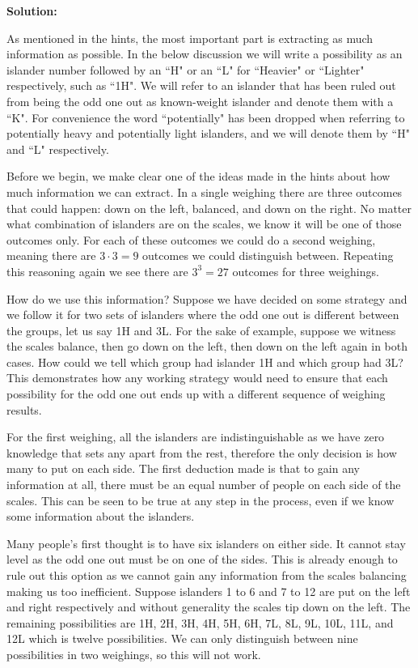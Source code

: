 \textbf{Solution:}

As mentioned in the hints, the most important part is extracting as much information as possible. In the below discussion we will write a possibility as an islander number followed by an ``H" or an ``L" for ``Heavier" or ``Lighter" respectively, such as ``1H". We will refer to an islander that has been ruled out from being the odd one out as known-weight islander and denote them with a ``K". For convenience the word ``potentially" has been dropped when referring to potentially heavy and potentially light islanders, and we will denote them by ``H" and ``L" respectively.

Before we begin, we make clear one of the ideas made in the hints about how much information we can extract. In a single weighing there are three outcomes that could happen: down on the left, balanced, and down on the right. No matter what combination of islanders are on the scales, we know it will be one of those outcomes only. For each of these outcomes we could do a second weighing, meaning there are $3 \cdot 3 = 9$ outcomes we could distinguish between. Repeating this reasoning again we see there are $3^3 = 27$ outcomes for three weighings.

How do we use this information? Suppose we have decided on some strategy and we follow it for two sets of islanders where the odd one out is different between the groups, let us say 1H and 3L. For the sake of example, suppose we witness the scales balance, then go down on the left, then down on the left again in both cases. How could we tell which group had islander 1H and which group had 3L? This demonstrates how any working strategy would need to ensure that each possibility for the odd one out ends up with a different sequence of weighing results.

For the first weighing, all the islanders are indistinguishable as we have zero knowledge that sets any apart from the rest, therefore the only decision is how many to put on each side. The first deduction made is that to gain any information at all, there must be an equal number of people on each side of the scales. This can be seen to be true at any step in the process, even if we know some information about the islanders.

Many people's first thought is to have six islanders on either side. It cannot stay level as the odd one out must be on one of the sides. This is already enough to rule out this option as we cannot gain any information from the scales balancing making us too inefficient. Suppose islanders 1 to 6 and 7 to 12 are put on the left and right respectively and without generality the scales tip down on the left. The remaining possibilities are 1H, 2H, 3H, 4H, 5H, 6H, 7L, 8L, 9L, 10L, 11L, and 12L which is twelve possibilities. We can only distinguish between nine possibilities in two weighings, so this will not work.


